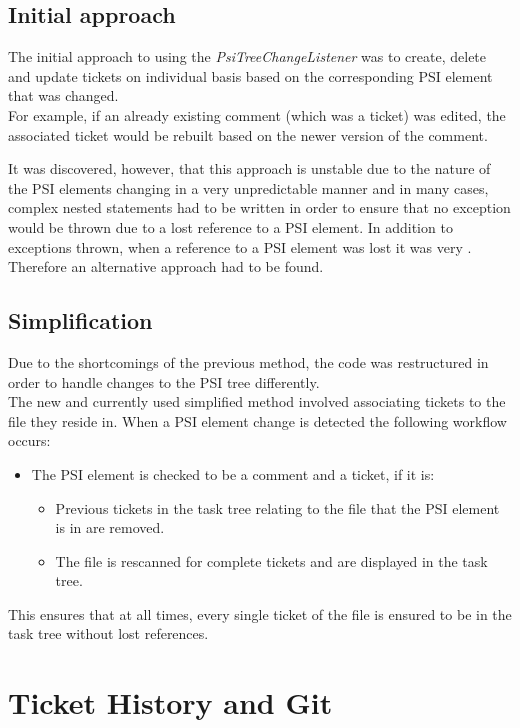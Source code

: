 \documentclass{4thYearProject}
\begin{document}
\subsection{Initial approach}

The initial approach to using the \textit{PsiTreeChangeListener} was to create, delete and update tickets on individual basis based on the corresponding PSI element that was changed. \\
For example, if an already existing comment (which was a ticket) was edited, the associated ticket would be rebuilt based on the newer version of the comment. 

It was discovered, however, that this approach is unstable due to the nature of the PSI elements changing in a very unpredictable manner and in many cases, complex nested statements had to be written in order to ensure that no exception would be thrown due to a lost reference to a PSI element. In addition to exceptions thrown, when a reference to a PSI element was lost it was very . Therefore an alternative approach had to be found.

\subsection{Simplification}

Due to the shortcomings of the previous method, the code was restructured in order to handle changes to the PSI tree differently. \\
The new and currently used simplified method involved associating tickets to the file they reside in. When a PSI element change is detected the following workflow occurs:

\begin{itemize}
\item The PSI element is checked to be a comment and a ticket, if it is:
\begin{itemize}
\item Previous tickets in the task tree relating to the file that the PSI element is in are removed.
\item The file is rescanned for complete tickets and are displayed in the task tree. 
\end{itemize}
\end{itemize}

This ensures that at all times, every single ticket of the file is ensured to be in the task tree without lost references.

\section{Ticket History and Git}
\end{document}
